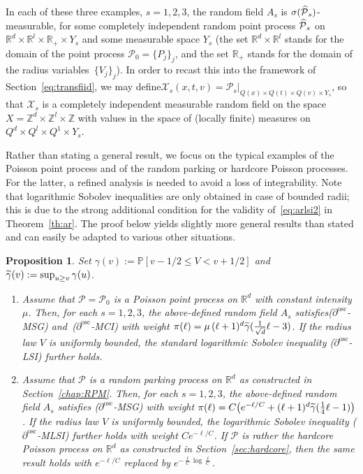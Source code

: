 \documentclass[11pt]{article}
\newtheorem{prop}[theo]{Proposition}
\theoremstyle{definition}
\numberwithin{equation}{section}
\numberwithin{figure}{section}
\numberwithin{table}{section}
\newcommand{\R}{\mathbb R}
\newcommand{\Z}{\mathbb Z}
\newcommand{\p}{\mathbb{P}}
\newcommand{\X}{\mathcal X}
\newcommand{\Pc}{\mathcal P}
\newcommand{\osc}{\partial^{\mathrm{osc}}}
\newcommand*{\romanenumi}{\renewcommand*{\theenumi}{\roman{enumi}}}
\let\oldtilde\tilde
\renewcommand*{\tilde}[1]{\mathchoice{\widetilde{#1}}{\widetilde{#1}}{\oldtilde{#1}}{\oldtilde{#1}}}\let\oldhat\hat
\renewcommand*{\hat}[1]{\mathchoice{\widehat{#1}}{\widehat{#1}}{\oldhat{#1}}{\oldhat{#1}}}\let\oldexists\exists
\renewcommand*{\exists}{\mathrel{\oldexists}}
\begin{document}
In each of these three examples, $s=1,2,3$, the random field $A_s$ is $\sigma(\hat\Pc_s)$-measurable, for some completely independent random point process $\hat\Pc_s$ on $\R^d\times \R^l\times\R_+\times Y_s$ and some measurable space $Y_s$ (the set $\R^d\times\R^l$ stands for the domain of the point process $\Pc_0=\{P_j\}_j$, and the set $\R_+$ stands for the domain of the radius variables~$\{V_j\}_j$). In order to recast this into the framework of Section~\ref{eq:transfiid}, we may define\linebreak$\X_s(x,t,v)=\Pc_s|_{Q(x)\times Q(t)\times Q(v)\times Y_s}$, so that $\X_s$ is a completely independent measurable random field on the space $X=\Z^d\times \Z^l\times\Z$ with values in the space of (locally finite) measures on $Q^d\times Q^l\times Q^1\times Y_s$.


Rather than stating a general result, we focus on the typical examples of the Poisson point process and of the random parking or hardcore Poisson processes. For the latter, a refined analysis is needed to avoid a loss of integrability. Note that logarithmic Sobolev inequalities are only obtained in case of bounded radii; this is due to the strong additional condition for the validity of~\eqref{eq:arlsi2} in Theorem~\ref{th:ar}. The proof below yields slightly more general results than stated and can easily be adapted to various other situations. 


\begin{prop}\label{prop:genincl-loss}
Set $\gamma(v):=\p[v-1/2\le V< v+1/2]$ and $\tilde\gamma(v)\linebreak:=\sup_{u\ge v}\gamma(u)$.
\begin{enumerate}\romanenumi
\item \label{prop3.6.1}Assume that $\Pc=\Pc_0$ is a Poisson point process on $\R^d$ with constant intensity $\mu$. Then, for each $s=1,2,3$, the above-defined random field $A_s$ satisfies\linebreak\emph{($\osc$-MSG)} and~\emph{($\osc$-MCI)} with weight $\pi(\ell)=\mu\,(\ell+1)^d\tilde\gamma(\frac1{\sqrt d}\ell-3)$. If the radius law $V$ is uniformly bounded, the standard logarithmic Sobolev inequality \emph{($\osc$-LSI)} further holds.%
\item \label{prop3.6.2}Assume that $\Pc$ is a random parking process on $\R^d$ as constructed in Section~\ref{chap:RPM}. Then, for each $s=1,2,3$, the above-defined random field $A_s$ satisfies \emph{($\osc$-MSG)} with weight $\pi(\ell)=C\big(e^{-\ell/C}+(\ell+1)^d\tilde\gamma(\frac14\ell-1)\big)$. If the radius law $V$ is uniformly bounded, the logarithmic Sobolev inequality \emph{($\osc$-MLSI)} further holds with weight $Ce^{-\ell/C}$. If $\Pc$ is rather the hardcore Poisson process on $\R^d$ as constructed in Section~\ref{sec:hardcore}, then the same result holds with $e^{-\ell/C}$ replaced by $e^{-\frac\ell C\log\frac\ell C}$.

\end{enumerate}
\end{prop}
\end{document}
